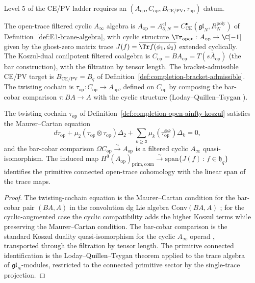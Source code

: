 Level 5 of the CE/PV ladder requires an
\((A_{\mathrm{op}},C_{\mathrm{op}},B_{\mathrm{CE/PV}},\tau_{\mathrm{op}})\)
datum.

\begin{defn}
\label{def:completion-open-ainfty-koszul}
The open-trace filtered cyclic \(A_\infty\) algebra is
\(A_{\mathrm{op}}=A^{\mathrm{cl}}_{\partial,N}=
C^\bullet_{\mathrm{CE}}(\mathfrak{gl}_N,R^{\mathrm{poly}}_N)\) of
Definition~\ref{def:E1-brane-algebra}, with cyclic structure
\(\Tr_{\mathrm{open}}:A_{\mathrm{op}}\to\C[-1]\) given by the
ghost-zero matrix trace \(J(f)=\overline{\Tr f(\phi_1,\phi_2)}\)
extended cyclically.  The Koszul-dual conilpotent filtered
coalgebra is
\(C_{\mathrm{op}}=BA_{\mathrm{op}}=
T(s\overline{A}_{\mathrm{op}})\) (the bar construction), with the
filtration by tensor length.  The bracket-admissible CE/PV target
is \(B_{\mathrm{CE/PV}}=B_q\) of
Definition~\ref{def:completion-bracket-admissible}.  The twisting
cochain is
\(\tau_{\mathrm{op}}:C_{\mathrm{op}}\to A_{\mathrm{op}}\), defined
on \(C_{\mathrm{op}}\) by composing the bar-cobar comparison
\(\tau:BA\to A\) with the cyclic structure (Loday--Quillen--Tsygan
\cite{loday-quillen}\cite{tsygan}).
\end{defn}

\begin{thm}
\label{thm:completion-tau-op-mc}
The twisting cochain \(\tau_{\mathrm{op}}\) of
Definition~\ref{def:completion-open-ainfty-koszul} satisfies the
Maurer--Cartan equation
\[
  d\tau_{\mathrm{op}}
  +\mu_2(\tau_{\mathrm{op}}\otimes\tau_{\mathrm{op}})\Delta_2
  +\sum_{k\ge 3}\mu_k(\tau_{\mathrm{op}}^{\otimes k})\Delta_k=0,
\]
and the bar-cobar comparison
\(\Omega C_{\mathrm{op}}\xrightarrow{\sim}A_{\mathrm{op}}\) is a
filtered cyclic \(A_\infty\) quasi-isomorphism.  The induced map
\(H^0(A_{\mathrm{op}})_{\mathrm{prim,conn}}\xrightarrow{\sim}
\mathrm{span}\{J(f)\,:\,f\in\mathfrak h_q\}\) identifies the
primitive connected open-trace cohomology with the linear span of
the trace maps.
\end{thm}

\begin{proof}
The twisting-cochain equation is the Maurer--Cartan condition for
the bar-cobar pair \((BA,A)\) in the convolution dg Lie algebra
\(\mathrm{Conv}(BA,A)\) \cite{loday-vallette}; for
the cyclic-augmented case the cyclic compatibility adds the higher
Koszul terms while preserving the Maurer--Cartan condition.
The bar-cobar comparison is the standard Koszul duality
quasi-isomorphism for the cyclic \(A_\infty\) operad
\cite{getzler-jones-aoperad}, transported through the filtration
by tensor length.  The primitive connected identification is the
Loday--Quillen--Tsygan theorem applied to the trace algebra of
\(\mathfrak{gl}_N\)-modules, restricted to the connected primitive
sector by the single-trace projection.
\end{proof}

